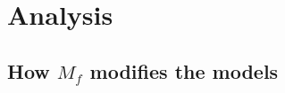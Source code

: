 \documentclass[11pt]{article}
\begin{document}




\section{Analysis}


\subsection{How $M_f$ modifies the models}\label{sec:mfanalysis}
\end{document}
